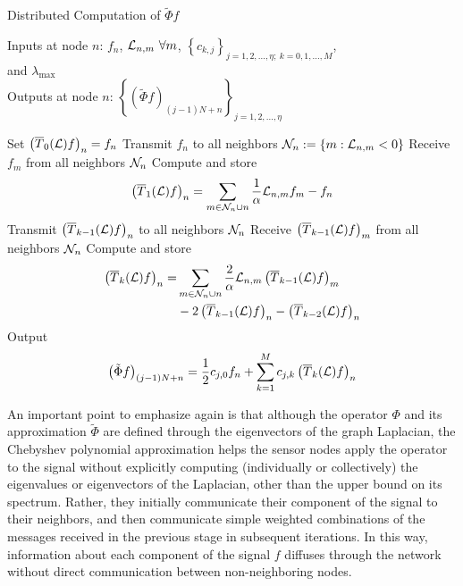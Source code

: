 \documentclass[conference]{IEEEtran}
\renewcommand{\L}{{\mathcal{L}}}
\def\L{{\cal L}}
\begin{document}
\begin{algorithm}[t] \label{alg1}
\caption{Distributed Computation of $\tilde{\Phi}f$}
Inputs at node $n$: $f_n$, $\L_{n,m}~\forall m$, $\left\{c_{k,j}\right\}_{j=1,2,\ldots,\eta;~k=0,1,\ldots,M}$, \\
      and $\lambda_{\max}$ \\
   Outputs at node $n$: $\left\{\left(\tilde{\Phi} f\right)_{(j-1)N+n}\right\}_{j=1,2,\ldots,\eta}$ \\ \begin{algorithmic}[1]
   \STATE Set $\left(\overline{T}_0(\L)f\right)_n = f_n$
   \STATE Transmit $f_n$ to all neighbors ${\cal N}_n:=\{m:\L_{n,m} < 0\}$
   \STATE Receive $f_m$ from all neighbors ${\cal N}_n$
   \STATE Compute and store
   \begin{align*}
   \left(\overline{T}_1(\L)f\right)_n =
  \sum\limits_{m \in {\cal N}_n \cup n}\frac{1}{\alpha}\L_{n,m}f_m  -f_n
  \end{align*}
   \STATE Transmit $\left(\overline{T}_{k-1}(\L)f\right)_n$ to all neighbors ${\cal N}_n$
    \STATE Receive $\left(\overline{T}_{k-1}(\L)f\right)_m$ from all neighbors ${\cal N}_n$
   \STATE Compute and store
   \begin{align*}
   \left(\overline{T}_k(\L)f\right)_n =&
 \sum\limits_{m \in {\cal N}_n \cup n} \frac{2}{\alpha}\L_{n,m}\left(\overline{T}_{k-1}(\L)f\right)_m  \\
 &-2\left(\overline{T}_{k-1}(\L)f\right)_n
  - \left(\overline{T}_{k-2}(\L)f\right)_n
  \end{align*}
   \ENDFOR
   \STATE Output
   \begin{align*}
   \left(\tilde{\Phi} f\right)_{(j-1)N+n} = \frac{1}{2}c_{j,0}f_n+\sum\limits_{k=1}^M c_{j,k} \left(\overline{T}_k(\L)f\right)_n
   \end{align*}
   \ENDFOR
   \end{algorithmic}
   \end{algorithm}



An important point to emphasize again is that although the operator $\Phi$ and its approximation $\tilde{\Phi}$ are defined through the eigenvectors of the graph Laplacian, the Chebyshev polynomial approximation helps the sensor nodes apply the operator to the signal without explicitly computing (individually or collectively) the eigenvalues or eigenvectors of the Laplacian, other than the upper bound on its spectrum. Rather, they initially communicate their component of the signal to their neighbors, and then communicate simple weighted combinations of the messages received in the previous stage in subsequent iterations. In this way, information about each component of the signal $f$ diffuses through the network
without direct communication between non-neighboring nodes.
\end{document}
